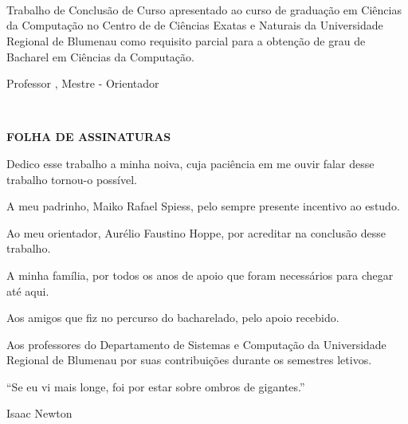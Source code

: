 \documentclass[notes.tex]{subfiles}
\renewcommand{\imprimircapa}{

    \DoubleSpacing

    \begin{centering}

        {\bfseries \MakeUppercase{\imprimirinstituicao}\par}
    
        \vspace*{\fill} \vspace*{\fill} \vspace*{\fill} \vspace*{\fill}
        \vspace*{\fill} \vspace*{\fill} \vspace*{\fill}
    
        \bfseries\LARGE\MakeUppercase{\imprimirtitulo}\\
    
        \vspace*{\fill}

        \begin{flushright}
            \bfseries \MakeUppercase{\imprimirautor}
        \end{flushright}   

        \vspace*{\fill} \vspace*{\fill} \vspace*{\fill} \vspace*{\fill}
        \vspace*{\fill} \vspace*{\fill}

        \SingleSpace

        {\bfseries \MakeUppercase{\imprimirlocal} \\ \MakeUppercase{\imprimirdata} }
        \vspace*{\fill}

    \end{centering}
    \pdfbookmark[0]{Capa}{}
    \pagebreak
}
\renewcommand{\imprimirfolhaderosto}{

    \SingleSpace
    \begin{centering}

        {\bfseries \MakeUppercase{\imprimirautor}\par}
    
        \vspace*{\fill} \vspace*{\fill}
    
        {\bfseries\LARGE\MakeUppercase{\imprimirtitulo}}\\
    
        \vspace*{\fill}

        \begin{flushright}
            \parbox{0.5\textwidth}{%
                Trabalho de Conclusão de Curso apresentado ao curso de graduação em Ciências da Computação no Centro de de Ciências Exatas e Naturais da Universidade Regional de Blumenau como requisito parcial para a obtenção de grau de Bacharel em Ciências da Computação.
            }
        \end{flushright}   

        \begin{flushright}
            \parbox{\textwidth*3/5}{%
                Professor \imprimirorientador, Mestre - Orientador
            }
        \end{flushright}   

        \vspace*{\fill} \vspace*{\fill} \vspace*{\fill}
        \vspace*{\fill} \vspace*{\fill} \vspace*{\fill}

        {\bfseries \MakeUppercase{\imprimirlocal} \\ \MakeUppercase{\imprimirdata} }

    \end{centering}
    \pagebreak
}
\newcommand{\imprimirfolhadeassinaturas}{
    \SingleSpace
    \begin{centering}
        \vspace*{\fill} 
        {\bfseries\LARGE\MakeUppercase{Folha de assinaturas}} 
        \vspace*{\fill}
    \end{centering}
    \pagebreak
}
\begin{document}
\imprimircapa

\imprimirfolhaderosto

\imprimirfolhadeassinaturas

\begin{dedicatoria}
    \vspace*{\fill}
    \hfill
    \parbox{0.5\textwidth}{%
        Dedico esse trabalho a minha noiva, cuja paciência em me ouvir falar desse trabalho tornou-o possível.
    }
    \vspace*{\fill}
\end{dedicatoria}
\pagebreak

\DoubleSpacing
\begin{agradecimentos}
    A meu padrinho, Maiko Rafael Spiess, pelo sempre presente incentivo ao estudo.

    Ao meu orientador, Aurélio Faustino Hoppe, por acreditar na conclusão desse trabalho.

    A minha família, por todos os anos de apoio que foram necessários para chegar até aqui.

    Aos amigos que fiz no percurso do bacharelado, pelo apoio recebido.

    Aos professores do Departamento de Sistemas e Computação da Universidade Regional de Blumenau por suas contribuições durante os semestres letivos.
\end{agradecimentos}
\pagebreak

\SingleSpace
\begin{epigrafe}
    \vspace*{\fill}

    \hfill
    \parbox{0.51\textwidth}{%
    ``Se eu vi mais longe, foi por estar sobre ombros de gigantes.''
    }

    \begin{flushright}
    Isaac Newton
    \end{flushright}
    \vspace*{\fill}
\end{epigrafe}
\end{document}
